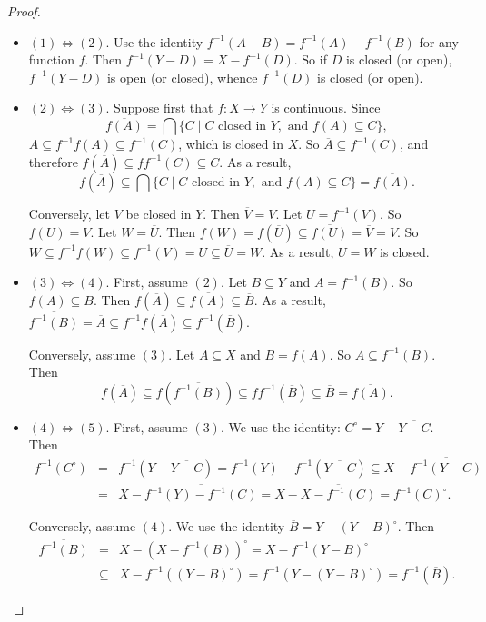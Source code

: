 \documentclass[12pt]{article}
\begin{document}
\begin{proof}
\begin{itemize}
\item $(1)\Leftrightarrow (2)$.  Use the identity $f^{-1}(A-B)=f^{-1}(A)-f^{-1}(B)$ for any function $f$.  Then $f^{-1}(Y-D)=X-f^{-1}(D)$.  So if $D$ is closed (or open), $f^{-1}(Y-D)$ is open (or closed), whence $f^{-1}(D)$ is closed (or open).
\item $(2)\Leftrightarrow (3)$.  Suppose first that $f:X\to Y$ is continuous.  Since $$\overline{f(A)}=\bigcap \lbrace C \mid C\mbox{ closed in }Y,\mbox{ and }f(A)\subseteq C\rbrace,$$ $A\subseteq f^{-1}f(A)\subseteq f^{-1}(C)$, which is closed in $X$.  So $\overline{A} \subseteq f^{-1}(C)$, and therefore $f(\overline{A})\subseteq ff^{-1}(C)\subseteq C$.  As a result, $$f(\overline{A})\subseteq \bigcap \lbrace C \mid C\mbox{ closed in }Y,\mbox{ and }f(A)\subseteq C\rbrace = \overline{f(A)}.$$

Conversely, let $V$ be closed in $Y$.  Then $\overline{V}=V$.  Let $U=f^{-1}(V)$.  So $f(U)=V$.  Let $W=\overline{U}$.  Then $f(W)=f(\overline{U})\subseteq \overline{f(U)}=\overline{V}=V$.  So $W\subseteq f^{-1}f(W)\subseteq f^{-1}(V)=U \subseteq \overline{U}=W$.  As a result, $U=W$ is closed.

\item $(3)\Leftrightarrow (4)$.  First, assume $(2)$.  Let $B\subseteq Y$ and $A=f^{-1}(B)$.  So $f(A)\subseteq B$.  Then $f(\overline{A})\subseteq \overline{f(A)} \subseteq  \overline{B}$.  As a result, $\overline{f^{-1}(B)}=\overline{A}\subseteq f^{-1}f(\overline{A})\subseteq f^{-1}(\overline{B})$.

Conversely, assume $(3)$.  Let $A\subseteq X$ and $B=f(A)$.  So $A\subseteq f^{-1}(B)$.  Then $$f(\overline{A}) \subseteq f(\overline{f^{-1}(B)}) \subseteq ff^{-1}(\overline{B})\subseteq \overline{B} =\overline{f(A)}.$$

\item $(4)\Leftrightarrow (5)$.  First, assume $(3)$.  We use the identity: $C^{\circ}=Y-\overline{Y-C}$.  Then 
\begin{eqnarray*}
f^{-1}(C^{\circ}) &=& f^{-1}(Y-\overline{Y-C})=f^{-1}(Y)-f^{-1}(\overline{Y-C})\subseteq X-\overline{f^{-1}(Y-C)} \\ &=& X-\overline{f^{-1}(Y)-f^{-1}(C)}=X-\overline{X-f^{-1}(C)}=f^{-1}(C)^{\circ}.
\end{eqnarray*}

Conversely, assume $(4)$.  We use the identity $\overline{B}=Y-(Y-B)^{\circ}$.  Then 
\begin{eqnarray*}
\overline{f^{-1}(B)} &=& X-(X-f^{-1}(B))^{\circ} = X-f^{-1}(Y-B)^{\circ} \\ &\subseteq& X-f^{-1}((Y-B)^{\circ}) =f^{-1}(Y-(Y-B)^{\circ})=f^{-1}(\overline{B}).
\end{eqnarray*}
\end{itemize}
\end{proof}
\end{document}

